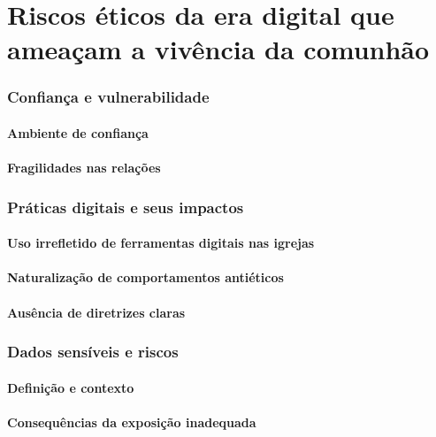 \newpage
\chapter{Riscos éticos da era digital que ameaçam a vivência da comunhão}

\subsection{Confiança e vulnerabilidade}

\subsubsection{Ambiente de confiança}

\subsubsection{Fragilidades nas relações}

\subsection{Práticas digitais e seus impactos}

\subsubsection{Uso irrefletido de ferramentas digitais nas igrejas}

\subsubsection{Naturalização de comportamentos antiéticos}

\subsubsection{Ausência de diretrizes claras}

\subsection{Dados sensíveis e riscos}

\subsubsection{Definição e contexto}

\subsubsection{Consequências da exposição inadequada}

